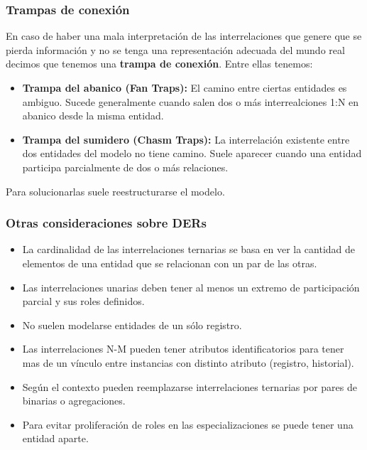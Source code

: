 \subsubsection*{Trampas de conexión}
En caso de haber una mala interpretación de las interrelaciones que genere que se pierda información y no se tenga una representación adecuada del mundo real decimos que tenemos una \textbf{trampa de conexión}. Entre ellas tenemos:
\begin{itemize}
    \item \textbf{Trampa del abanico (Fan Traps):} El camino entre ciertas entidades es ambiguo. Sucede generalmente cuando salen dos o más interrealciones 1:N en abanico desde la misma entidad.
    \item \textbf{Trampa del sumidero (Chasm Traps):} La interrelación existente entre dos entidades del modelo no tiene camino. Suele aparecer cuando una entidad participa parcialmente de dos o más relaciones.
\end{itemize}
Para solucionarlas suele reestructurarse el modelo.

\subsubsection*{Otras consideraciones sobre DERs}
\begin{itemize}
    \item La cardinalidad de las interrelaciones ternarias se basa en ver la cantidad de elementos de una entidad que se relacionan con un par de las otras.
    \item Las interrelaciones unarias deben tener al menos un extremo de participación parcial y sus roles definidos.
    \item No suelen modelarse entidades de un sólo registro.
    \item Las interrelaciones N-M pueden tener atributos identificatorios para tener mas de un vínculo entre instancias con distinto atributo (registro, historial).
    \item Según el contexto pueden reemplazarse interrelaciones ternarias por pares de binarias o agregaciones.
    \item Para evitar proliferación de roles en las especializaciones se puede tener una entidad aparte.
\end{itemize}

